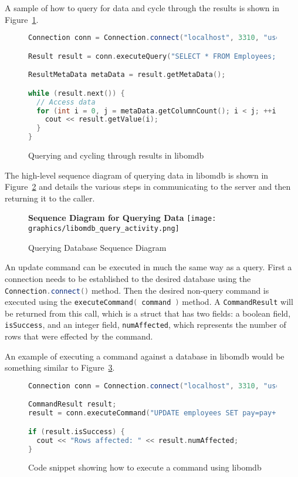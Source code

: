 \documentclass[letterpaper, 12pt]{article}
\newcommand{\inlinecode}[1]{\colorbox{codegrey}{\lstinline[language=C++]{#1}}}
\begin{document}
  A sample of how to query for data and cycle through the results is shown in Figure~\ref{code:lib_query_cycle}.
  \begin{figure}
  \begin{lstlisting}[language=C++]
Connection conn = Connection.connect("localhost", 3310, "users");

Result result = conn.executeQuery("SELECT * FROM Employees;");

ResultMetaData metaData = result.getMetaData();

while (result.next()) {
  // Access data
  for (int i = 0, j = metaData.getColumnCount(); i < j; ++i) {
    cout << result.getValue(i);
  }
}
  \end{lstlisting}
  \label{code:lib_query_cycle}
  \caption{Querying and cycling through results in libomdb}
  \end{figure}
  \par\vspace{\baselineskip}
  The high-level sequence diagram of querying data in libomdb is shown in Figure~\ref{fig:lib_query_activity}
  and details the various steps in communicating to the server and then returning it to the
  caller.

  \begin{figure}
    \centering
    \textbf{Sequence Diagram for Querying Data}
    \texttt{[image: graphics/libomdb\_query\_activity.png]}
    \caption{Querying Database Sequence Diagram}
    \label{fig:lib_query_activity}
  \end{figure}
  \par\vspace{\baselineskip}

  An update command can be executed in much the same way as a query. First
  a connection needs to be established to the desired database using the
  \inlinecode{Connection.connect()} method. Then the desired non-query
  command is executed using the \inlinecode{executeCommand( command )} method.
  A \inlinecode{CommandResult} will be returned from this call,
  which is a struct that has two fields: a boolean field,
  \inlinecode{isSuccess}, and an integer field,
  \inlinecode{numAffected}, which represents the number of rows
  that were effected by the command.
  \par\vspace{\baselineskip}
  An example of executing a command against a database in libomdb would be something similar
  to Figure~\ref{code:lib_cmd_exec}.
  \begin{figure}
  \begin{lstlisting}[language=C++]
Connection conn = Connection.connect("localhost", 3310, "users");

CommandResult result;
result = conn.executeCommand("UPDATE employees SET pay=pay+1;");

if (result.isSuccess) {
  cout << "Rows affected: " << result.numAffected;
}
  \end{lstlisting}
  \label{code:lib_cmd_exec}
  \caption{Code snippet showing how to execute a command using libomdb}
  \end{figure}
 
\end{document}
